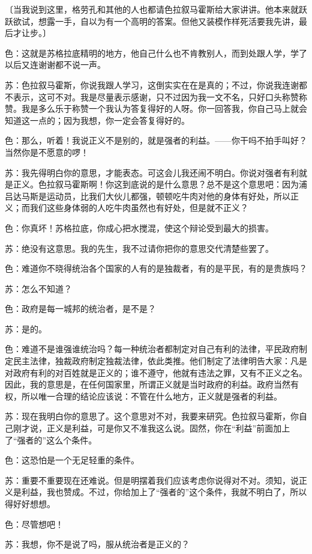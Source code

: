 \documentclass[12pt,oneside]{book}
\begin{document}
〔当我说到这里，格劳孔和其他的人也都请色拉叙马霍斯给大家讲讲。他本来就跃跃欲试，想露一手，自以为有一个高明的答案。但他又装模作样死活要我先讲，最后才让步。〕

色：这就是苏格拉底精明的地方，他自己什么也不肯教别人，而到处跟人学，学了以后又连谢谢都不说一声。

苏：色拉叙马霍斯，你说我跟人学习，这倒实实在在是真的；不过，你说我连谢都不表示，这可不对。我是尽量表示感谢，只不过因为我一文不名，只好口头称赞称赞。我是多么乐于称赞一个我认为答复得好的人呀。你一回答我，你自己马上就会知道这一点的；因为我想，你一定会答复得好的。

色：那么，听着！我说正义不是别的，就是强者的利益。——你干吗不拍手叫好？当然你是不愿意的啰！

苏：我先得明白你的意思，才能表态。可这会儿我还闹不明白。你说对强者有利就是正义。色拉叙马霍斯啊！你这到底说的是什么意思？总不是这个意思吧：因为浦吕达马斯是运动员，比我们大伙儿都强，顿顿吃牛肉对他的身体有好处，所以正义；而我们这些身体弱的人吃牛肉虽然也有好处，但是就不正义？

色：你真坏！苏格拉底，你成心把水搅混，使这个辩论受到最大的损害。

苏：绝没有这意思。我的先生，我不过请你把你的意思交代清楚些罢了。

色：难道你不晓得统治各个国家的人有的是独裁者，有的是平民，有的是贵族吗？

苏：怎么不知道？

色：政府是每一城邦的统治者，是不是？

苏：是的。

色：难道不是谁强谁统治吗？每一种统治者都制定对自己有利的法律，平民政府制定民主法律，独裁政府制定独裁法律，依此类推。他们制定了法律明告大家：凡是对政府有利的对百姓就是正义的；谁不遵守，他就有违法之罪，又有不正义之名。因此，我的意思是，在任何国家里，所谓正义就是当时政府的利益。政府当然有权，所以唯一合理的结论应该说：不管在什么地方，正义就是强者的利益。

苏：现在我明白你的意思了。这个意思对不对，我要来研究。色拉叙马霍斯，你自己刚才说，正义是利益，可是你又不准我这么说。固然，你在“利益”前面加上了“强者的”这么个条件。

色：这恐怕是一个无足轻重的条件。

苏：重要不重要现在还难说。但是明摆着我们应该考虑你说得对不对。须知，说正义是利益，我也赞成。不过，你给加上了“强者的”这个条件，我就不明白了，所以得好好想想。

色：尽管想吧！

苏：我想，你不是说了吗，服从统治者是正义的？
\end{document}
